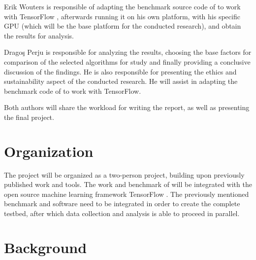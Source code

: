 \documentclass[12pt,twoside]{article}
\begin{document}
Erik Wouters is responsible of adapting the benchmark source code of \cite{Vinkler2015} to work with TensorFlow \cite{abadi2016}, afterwards running it on his own platform, with his specific GPU (which will be the base platform for the conducted research), and obtain the results for analysis.

Dragoş Perju is responsible for analyzing the results, choosing the base factors for comparison of the selected algorithms for study and finally providing a conclusive discussion of the findings. He is also responsible for presenting the ethics and sustainability aspect of the conducted research. He will assist in adapting the benchmark code of \cite{Vinkler2015} to work with TensorFlow.

Both authors will share the workload for writing the report, as well as presenting the final project.

\section{Organization}
\label{sec:organization}


The project will be organized as a two-person project, building upon previously published work and tools. The work and benchmark of \citeauthor{Vinkler2015} \cite{Vinkler2015} will be integrated with the open source machine learning framework TensorFlow \cite{abadi2016}. The previously mentioned benchmark and software need to be integrated in order to create the complete testbed, after which data collection and analysis is able to proceed in parallel.

\section{Background}
\label{sec:background}


\end{document}
